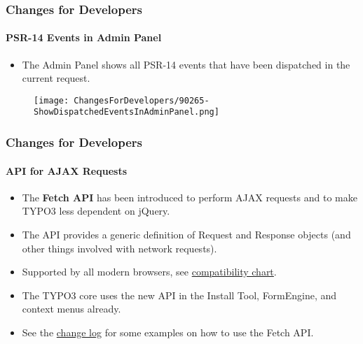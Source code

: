 
\begin{frame}[fragile]
	\frametitle{Changes for Developers}
	\framesubtitle{PSR-14 Events in Admin Panel}

	\begin{itemize}
		\item The Admin Panel shows all PSR-14 events that have been dispatched in the current request.
	\end{itemize}

	\begin{figure}
		\texttt{[image: ChangesForDevelopers/90265-ShowDispatchedEventsInAdminPanel.png]}
	\end{figure}

\end{frame}


\begin{frame}[fragile]
	\frametitle{Changes for Developers}
	\framesubtitle{API for AJAX Requests}

	\lstset{basicstyle=\tiny\ttfamily}

	\begin{itemize}
		\item The \textbf{Fetch API} has been introduced to perform AJAX requests
			and to make TYPO3 less dependent on jQuery.
		\item The API provides a generic definition of Request and Response objects
			(and other things involved with network requests).
		\item Supported by all modern browsers, see
			\href{https://developer.mozilla.org/en-US/docs/Web/API/Fetch_API}{compatibility chart}.
		\item The TYPO3 core uses the new API in the Install Tool, FormEngine, and
			context menus already.
		\item See the
			\href{https://docs.typo3.org/c/typo3/cms-core/master/en-us/Changelog/10.3/Feature-89738-ApiForAjaxRequests.html}{change log}
			for some examples on how to use the Fetch API.

	\end{itemize}

\end{frame}

